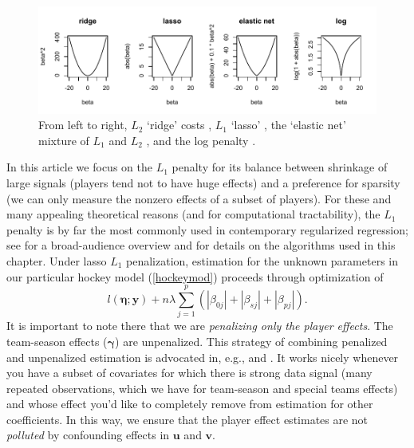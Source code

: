 \begin{figure}[t]
\includegraphics[width=\textwidth]{figures/penalties}
\caption{\label{costs} 
From left to right, 
$L_2$ `ridge' costs \cite{hoerl_ridge_1970}, $L_1$ `lasso' \cite{tibshirani_regression_1996}, the `elastic net' mixture of $L_1$ and $L_2$ \cite{zou_regularization_2005}, and the log penalty \cite{candes_enhancing_2008}.
}
\end{figure}

In this article we focus on the $L_1$ penalty for its balance between
shrinkage of large signals (players tend not to have huge effects) and a
preference for sparsity (we can only measure the nonzero effects of a subset
of players).  For these and many appealing theoretical reasons (and for
computational tractability), the $L_1$ penalty is by far the most commonly
used in contemporary regularized regression; see
\cite{hastie:tibsh:fried:2001} for a broad-audience overview and
\cite{taddy_one-step_2015} for details on the algorithms used in this chapter.
Under lasso $L_1$ penalization, estimation for the unknown parameters in 
our particular hockey model (\ref{hockeymod}) proceeds through optimization of
\begin{equation} \label{pendev}
l\left(\boldsymbol{\eta}; \mathbf{y}\right) + n\lambda \sum_{j=1}^p\left(|\beta_{0j}| + |\beta_{sj}| + |\beta_{pj}|\right).
\end{equation}
It is important to note there that we are \textit{penalizing only the player
effects}.  The team-season effects ($\boldsymbol{\gamma}$) are unpenalized.
This strategy of combining penalized and unpenalized estimation is advocated
in, e.g.,
\cite{taddy_distributed_2015} and \cite{gentzkow_measuring_2015}.  It works
nicely whenever you have a subset of covariates for which there is strong data
signal (many repeated observations, which we have for team-season and special
teams effects) and whose effect you'd like to completely remove from
estimation for other coefficients.  In this way, we ensure that the player
effect estimates are not \textit{polluted} by confounding effects in
$\mathbf{u}$ and $\mathbf{v}$.  

